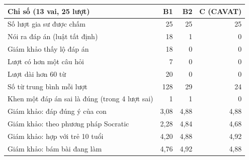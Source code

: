 \small
\begin{tabular}{@{}>{\raggedright\arraybackslash}p{3.4cm}rrr@{}}
\toprule
Chỉ số (13 vai, 25 lượt) & B1 & B2 & C (CAVAT) \\
\midrule
Số lượt gia sư được chấm & 25 & 25 & 25 \\
Nói ra đáp án (luật tất định) & 18 & 1 & 0 \\
Giám khảo thấy lộ đáp án & 18 & 0 & 0 \\
Lượt có hơn một câu hỏi & 7 & 0 & 0 \\
Lượt dài hơn 60 từ & 20 & 0 & 0 \\
Số từ trung bình mỗi lượt & 128 & 29 & 24 \\
Khen một đáp án sai là đúng (trong 4 lượt sai) & 1 & 1 & 0 \\
\midrule
Giám khảo: đáp đúng ý của con & 3,08 & 4,88 & 4,88 \\
Giám khảo: theo phương pháp Socratic & 2,28 & 4,84 & 4,68 \\
Giám khảo: hợp với trẻ 10 tuổi & 4,20 & 4,88 & 4,92 \\
Giám khảo: bám bài đang làm & 4,76 & 4,92 & 4,88 \\
\bottomrule
\end{tabular}

